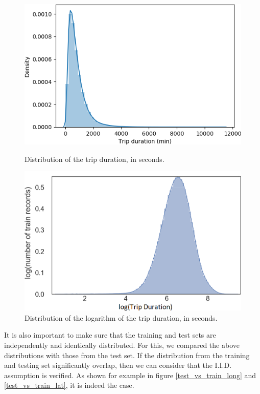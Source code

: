 \documentclass[a4paper]{article}
\begin{document}
\begin{figure}
    \centering
    \begin{minipage}{.45\textwidth}
        \includegraphics[width=\linewidth]{trip_duration}
        \caption{Distribution of the trip duration, in seconds.}
        \label{trip_duration}
    \end{minipage}
    \hspace{0.05\textwidth}
   \begin{minipage}{.45\textwidth}
       \includegraphics[width=\linewidth]{log_trip_duration}
       \caption{Distribution of the logarithm of the trip duration, in seconds.}
       \label{log_trip_duration}
    \end{minipage}
\end{figure}

 It is also important to make sure that the training and test sets are
independently and identically distributed. For this, we compared the above
distributions with those from the test set. If the distribution from the
training and testing set significantly overlap, then we can consider that the
I.I.D. assumption is verified. As shown for example in figure
\ref{test_vs_train_long} and \ref{test_vs_train_lat}, it is indeed the case.
\end{document}
